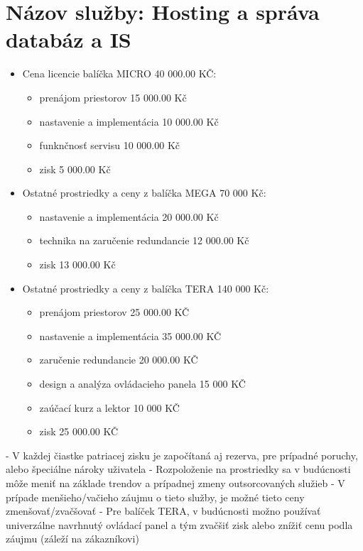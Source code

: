 \documentclass[a4paper, 11pt]{article}
\begin{document}
\section*{Názov služby: Hosting a správa databáz a IS}
\begin{itemize}
\item Cena licencie balíčka MICRO 40 000.00 KČ:
\begin{itemize}
\item prenájom priestorov 15 000.00 Kč
\item nastavenie a implementácia 10 000.00 Kč
\item funknčnosť servisu 10 000.00 Kč
\item zisk 5 000.00 Kč
\end{itemize}

\item  Ostatné prostriedky a ceny z balíčka MEGA 70 000 Kč:
\begin{itemize}
\item nastavenie a implementácia 20 000.00 Kč 
\item  technika na zaručenie redundancie 12 000.00 Kč
\item  zisk 13 000.00 Kč
\end{itemize}


\item  Ostatné prostriedky a ceny z balíčka TERA 140 000 Kč:
\begin{itemize}
\item prenájom priestorov 25 000.00 KČ
\item nastavenie a implementácia 35 000.00 KČ
\item zaručenie redundancie 20 000.00 KČ
\item design a analýza ovládacieho panela 15 000 KČ
\item zaúčací kurz a lektor 10 000 KČ
\item zisk 25 000.00 KČ
\end{itemize}


\end{itemize}

- V každej čiastke patriacej zisku je započítaná aj rezerva, pre prípadné poruchy, alebo špeciálne nároky uživatela
- Rozpoloženie na prostriedky sa v budúcnosti môže meniť na základe trendov a prípadnej zmeny outsorcovaných služieb
- V prípade menšieho/vačieho záujmu o tieto služby, je možné tieto ceny zmenšovať/zvačšovať
- Pre balíček TERA, v budúcnosti možno používať univerzálne navrhnutý ovládací panel a tým zvačšiť zisk alebo znížiť cenu podla záujmu (záleží na zákazníkovi)
\end{document}
